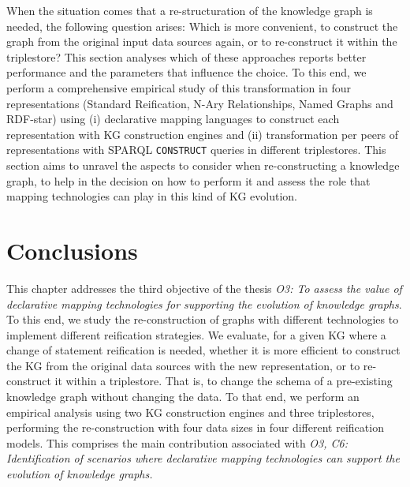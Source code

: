 When the situation comes that a re-structuration of the knowledge graph is needed, the following question arises: Which is more convenient, to construct the graph from the original input data sources again, or to re-construct it within the triplestore? This section analyses which of these approaches reports better performance and the parameters that influence the choice. 
To this end, we perform a comprehensive empirical study of this transformation in four representations (Standard Reification, N-Ary Relationships, Named Graphs and RDF-star) using (i) declarative mapping languages to construct each representation with KG construction engines and (ii) transformation per peers of representations with SPARQL \texttt{CONSTRUCT} queries in different triplestores. This section aims to unravel the aspects to consider when re-constructing a knowledge graph, to help in the decision on how to perform it and assess the role that mapping technologies can play in this kind of KG evolution. %



\section{Conclusions}

This chapter addresses the third objective of the thesis \textit{O3: To assess the value of declarative mapping technologies for supporting the evolution of knowledge graphs}.
To this end, we study the re-construction of graphs with different technologies to implement different reification strategies. We evaluate, for a given KG where a change of statement reification is needed, whether it is more efficient to construct the KG from the original data sources with the new representation, or to re-construct it within a triplestore. 
That is, to change the schema of a pre-existing knowledge graph without changing the data. To that end, we perform an empirical analysis using two KG construction engines and three triplestores, performing the re-construction with four data sizes in four different reification models. 
This comprises the main contribution associated with \textit{O3, C6: Identification of scenarios where declarative mapping technologies can support the evolution of knowledge graphs.}


